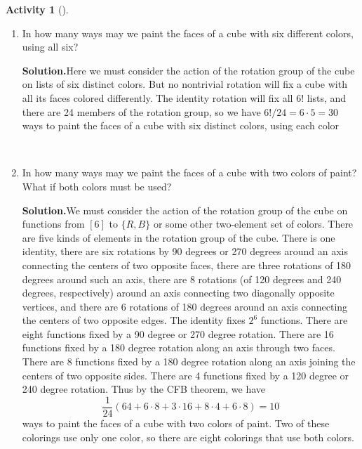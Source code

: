 \documentclass[10pt,]{book}
\theoremstyle{plain}
\theoremstyle{definition}
\newtheorem{activity}[project]{Activity}
\numberwithin{equation}{chapter}
\begin{document}
\begin{activity}[]\label{activity-299}
~\par
\begin{enumerate}[label=(\alph*)]
 \item In how many ways may we paint the faces of a cube with six different colors, using all six?%
\par\medskip\noindent%
\textbf{Solution.}\quad Here we must consider the action of the rotation group of the cube on lists of six distinct colors. But no nontrivial rotation will fix a cube with all its faces colored differently. The identity rotation will fix all \(6!\) lists, and there are 24 members of the rotation group, so we have \(6!/24=6\cdot5=30\) ways to paint the faces of a cube with six distinct colors, using each color%

~\par
\item In how many ways may we paint the faces of a cube with two colors of paint? What if both colors must be used?%
\par\medskip\noindent%
\textbf{Solution.}\quad We must consider the action of the rotation group of the cube on functions from \([6]\) to \(\{R,B\}\) or some other two-element set of colors. There are five kinds of elements in the rotation group of the cube. There is one identity, there are six rotations by 90 degrees or 270 degrees around an axis connecting the centers of two opposite faces, there are three rotations of 180 degrees around such an axis, there are 8 rotations (of 120 degrees and 240 degrees, respectively) around an axis connecting two diagonally opposite vertices, and there are 6 rotations of 180 degrees around an axis connecting the centers of two opposite edges. The identity fixes \(2^6\) functions. There are eight functions fixed by a 90 degree or 270 degree rotation. There are 16 functions fixed by a 180 degree rotation along an axis through two faces. There are 8 functions fixed by a 180 degree rotation along an axis joining the centers of two opposite sides. There are 4 functions fixed by a 120 degree or 240 degree rotation. Thus by the CFB theorem, we have%
\begin{equation*}
\frac{1}{24}(64+6\cdot8 + 3\cdot16+ 8\cdot 4 +6\cdot8)= 10
\end{equation*}
ways to paint the faces of a cube with two colors of paint. Two of these colorings use only one color, so there are eight colorings that use both colors.%

\end{enumerate}
\end{activity}
\end{document}
